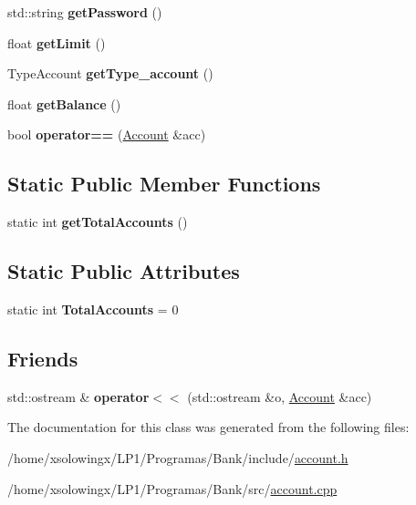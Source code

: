 \begin{DoxyCompactItemize}
std\+::string {\bfseries get\+Password} ()
\item 
\mbox{\label{classAccount_a579bd8d93fa3bcbf78dc9cba275eb269}} 
float {\bfseries get\+Limit} ()
\item 
\mbox{\label{classAccount_a70d66b5495190c8eacff6ff08eee36df}} 
Type\+Account {\bfseries get\+Type\+\_\+account} ()
\item 
\mbox{\label{classAccount_a6a55c17b886dce3a59b18bb746ba4301}} 
float {\bfseries get\+Balance} ()
\item 
\mbox{\label{classAccount_ac285f3e2c3e893cbece0c100cbe49659}} 
bool {\bfseries operator==} (\hyperlink{classAccount}{Account} \&acc)
\end{DoxyCompactItemize}
\subsection*{Static Public Member Functions}
\begin{DoxyCompactItemize}
\item 
\mbox{\label{classAccount_ab709beb9e2fc1233aacb62ffcbcd2144}} 
static int {\bfseries get\+Total\+Accounts} ()
\end{DoxyCompactItemize}
\subsection*{Static Public Attributes}
\begin{DoxyCompactItemize}
\item 
\mbox{\label{classAccount_a302696062a8878a4bd013249dd5bc823}} 
static int {\bfseries Total\+Accounts} = 0
\end{DoxyCompactItemize}
\subsection*{Friends}
\begin{DoxyCompactItemize}
\item 
\mbox{\label{classAccount_ad6ea1ae381a91af7074fbfab1374cd03}} 
std\+::ostream \& {\bfseries operator$<$$<$} (std\+::ostream \&o, \hyperlink{classAccount}{Account} \&acc)
\end{DoxyCompactItemize}


The documentation for this class was generated from the following files\+:\begin{DoxyCompactItemize}
\item 
/home/xsolowingx/\+L\+P1/\+Programas/\+Bank/include/\hyperlink{account_8h}{account.\+h}\item 
/home/xsolowingx/\+L\+P1/\+Programas/\+Bank/src/\hyperlink{account_8cpp}{account.\+cpp}\end{DoxyCompactItemize}
